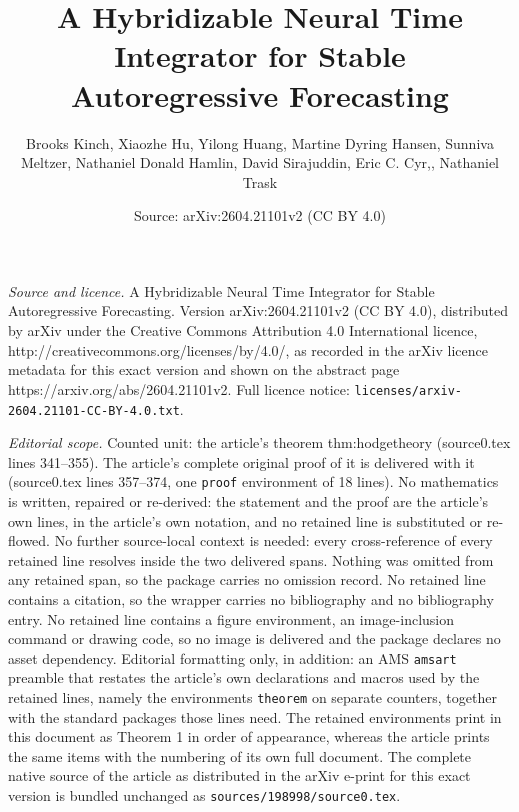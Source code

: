 \documentclass[10pt,a4paper]{amsart}
\title{A Hybridizable Neural Time Integrator for Stable Autoregressive Forecasting}
\author{Brooks Kinch, Xiaozhe Hu, Yilong Huang, Martine Dyring Hansen, Sunniva Meltzer, Nathaniel Donald Hamlin, David Sirajuddin, Eric C. Cyr,, Nathaniel Trask}
\date{Source: arXiv:2604.21101v2 (CC BY 4.0)}
\begin{document}
\maketitle

\noindent\emph{Source and licence.} A Hybridizable Neural Time Integrator for Stable Autoregressive Forecasting. Version arXiv:2604.21101v2 (CC BY 4.0), distributed by arXiv under the Creative Commons Attribution 4.0 International licence, http://creativecommons.org/licenses/by/4.0/, as recorded in the arXiv licence metadata for this exact version and shown on the abstract page https://arxiv.org/abs/2604.21101v2. Full licence notice: \texttt{licenses/arxiv-2604.21101-CC-BY-4.0.txt}.\par\smallskip

\noindent\textit{Editorial scope.} Counted unit: the article's theorem thm:hodgetheory (source0.tex lines 341--355). The article's complete original proof of it is delivered with it (source0.tex lines 357--374, one \texttt{proof} environment of 18 lines). No mathematics is written, repaired or re-derived: the statement and the proof are the article's own lines, in the article's own notation, and no retained line is substituted or re-flowed.  No further source-local context is needed: every cross-reference of every retained line resolves inside the two delivered spans.  Nothing was omitted from any retained span, so the package carries no omission record.  No retained line contains a citation, so the wrapper carries no bibliography and no bibliography entry.  No retained line contains a figure environment, an image-inclusion command or drawing code, so no image is delivered and the package declares no asset dependency.  Editorial formatting only, in addition: an AMS \texttt{amsart} preamble that restates the article's own declarations and macros used by the retained lines, namely the environments \texttt{theorem} on separate counters, together with the standard packages those lines need.  The retained environments print in this document as Theorem 1 in order of appearance, whereas the article prints the same items with the numbering of its own full document.  The complete native source of the article as distributed in the arXiv e-print for this exact version is bundled unchanged as \texttt{sources/198998/source0.tex}.
\end{document}
